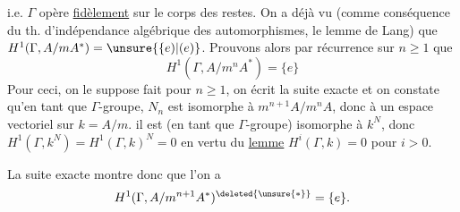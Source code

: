 i.e. $\Gamma$ opère \uline{fidèlement} sur le corps des restes. On a déjà vu (comme conséquence du th. d'indépendance algébrique des automorphismes,  le lemme de Lang) que $H^1(\Gamma,A/mA^*)=\unsure{\{e)|(e)}$. Prouvons alors par récurrence sur $n\geq1$ que
\[
H^1(\Gamma,A/m^n A^*)=\{e\}
\]
Pour ceci, on  le suppose fait pour $n\geq1$, on écrit la suite exacte
et on constate qu'en tant que $\Gamma$-groupe, $N_n$ est isomorphe à $m^{n+1}A/m^n A$, donc à un espace vectoriel sur $k=A/m$.  il est (en tant que $\Gamma$-groupe) isomorphe à $k^N$, donc $H^1(\Gamma,k^N)=H^1(\Gamma,k)^N=0$ en vertu du \uline{lemme} $H^i(\Gamma,k)=0$ pour $i>0$.

La suite exacte
montre donc que l'on a
\[
H^1(\Gamma,A/m^{n+1}A^*)^{\deleted{\unsure{*}}}=\{e\}.
\]
